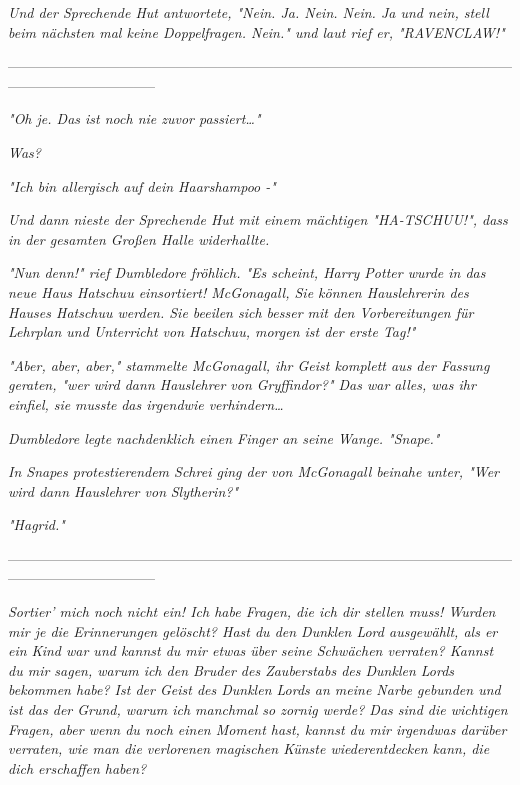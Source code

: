 {\emph{Und der Sprechende Hut antwortete, "\emph{Nein. Ja. Nein. Nein. Ja und nein, stell beim nächsten mal keine Doppelfragen. Nein.}" und laut rief er, "RAVENCLAW!"}

--------------------------------------------------------------------------------------------------------------------------------------------

\emph{"\emph{Oh je. Das ist noch nie zuvor passiert…}"}

\emph{\emph{Was?}}

\emph{"\emph{Ich bin allergisch auf dein Haarshampoo -}"}

\emph{Und dann nieste der Sprechende Hut mit einem mächtigen "HA-TSCHUU!", dass in der gesamten Großen Halle widerhallte.}

\emph{"Nun denn!" rief Dumbledore fröhlich. "Es scheint, Harry Potter wurde in das neue Haus Hatschuu einsortiert! McGonagall, Sie können Hauslehrerin des Hauses Hatschuu werden. Sie beeilen sich besser mit den Vorbereitungen für Lehrplan und Unterricht von Hatschuu, morgen ist der erste Tag!"}

\emph{"Aber, aber, aber," stammelte McGonagall, ihr Geist komplett aus der Fassung geraten, "wer wird dann Hauslehrer von Gryffindor?" Das war alles, was ihr einfiel, sie} \emph{\emph{musste}} \emph{das irgendwie verhindern…}

\emph{Dumbledore legte nachdenklich einen Finger an seine Wange. "Snape."}

\emph{In Snapes protestierendem Schrei ging der von McGonagall beinahe unter, "Wer wird dann Hauslehrer von} \emph{\emph{Slytherin?}"}

\emph{"Hagrid."}

--------------------------------------------------------------------------------------------------------------------------------------------

\emph{\emph{Sortier' mich noch nicht ein! Ich habe Fragen, die ich dir stellen muss! Wurden mir je die Erinnerungen gelöscht? Hast du den Dunklen Lord ausgewählt, als er ein Kind war und kannst du mir etwas über seine Schwächen verraten? Kannst du mir sagen, warum ich den Bruder des Zauberstabs des Dunklen Lords bekommen habe? Ist der Geist des Dunklen Lords an meine Narbe gebunden und ist das der Grund, warum ich manchmal so zornig werde? Das sind die wichtigen Fragen, aber wenn du noch einen Moment hast, kannst du mir irgendwas darüber verraten, wie man die verlorenen magischen Künste wiederentdecken kann, die dich erschaffen haben?}}

}
